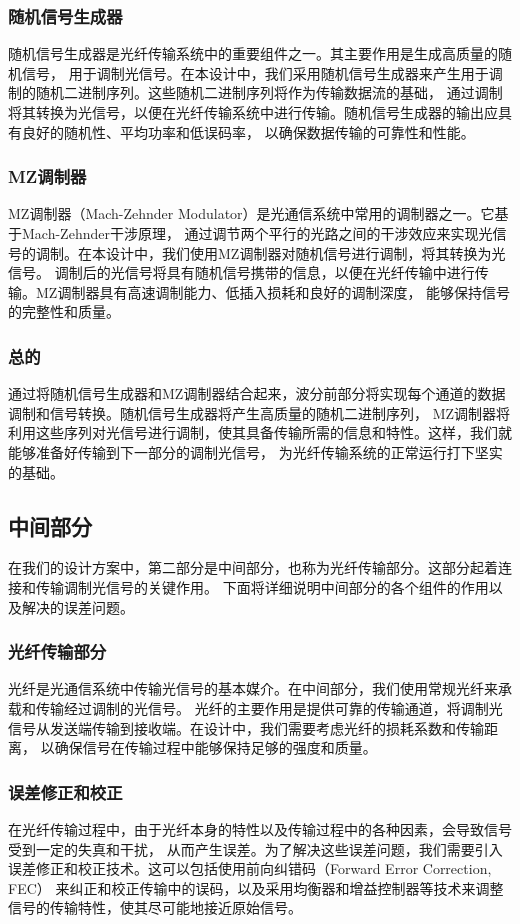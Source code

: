 \documentclass[12pt, a4paper, oneside]{article}
\begin{document}
\begin{spacing}{2.0}
\subsubsection*{随机信号生成器}
随机信号生成器是光纤传输系统中的重要组件之一。其主要作用是生成高质量的随机信号，
用于调制光信号。在本设计中，我们采用随机信号生成器来产生用于调制的随机二进制序列。这些随机二进制序列将作为传输数据流的基础，
通过调制将其转换为光信号，以便在光纤传输系统中进行传输。随机信号生成器的输出应具有良好的随机性、平均功率和低误码率，
以确保数据传输的可靠性和性能。
\subsubsection*{MZ调制器}
MZ调制器（Mach-Zehnder Modulator）是光通信系统中常用的调制器之一。它基于Mach-Zehnder干涉原理，
通过调节两个平行的光路之间的干涉效应来实现光信号的调制。在本设计中，我们使用MZ调制器对随机信号进行调制，将其转换为光信号。
调制后的光信号将具有随机信号携带的信息，以便在光纤传输中进行传输。MZ调制器具有高速调制能力、低插入损耗和良好的调制深度，
能够保持信号的完整性和质量。
\subsubsection*{总的}
通过将随机信号生成器和MZ调制器结合起来，波分前部分将实现每个通道的数据调制和信号转换。随机信号生成器将产生高质量的随机二进制序列，
MZ调制器将利用这些序列对光信号进行调制，使其具备传输所需的信息和特性。这样，我们就能够准备好传输到下一部分的调制光信号，
为光纤传输系统的正常运行打下坚实的基础。

\subsection{中间部分}
在我们的设计方案中，第二部分是中间部分，也称为光纤传输部分。这部分起着连接和传输调制光信号的关键作用。
下面将详细说明中间部分的各个组件的作用以及解决的误差问题。
\subsubsection*{光纤传输部分}
光纤是光通信系统中传输光信号的基本媒介。在中间部分，我们使用常规光纤来承载和传输经过调制的光信号。
光纤的主要作用是提供可靠的传输通道，将调制光信号从发送端传输到接收端。在设计中，我们需要考虑光纤的损耗系数和传输距离，
以确保信号在传输过程中能够保持足够的强度和质量。
\subsubsection*{误差修正和校正}
在光纤传输过程中，由于光纤本身的特性以及传输过程中的各种因素，会导致信号受到一定的失真和干扰，
从而产生误差。为了解决这些误差问题，我们需要引入误差修正和校正技术。这可以包括使用前向纠错码（Forward Error Correction, FEC）
来纠正和校正传输中的误码，以及采用均衡器和增益控制器等技术来调整信号的传输特性，使其尽可能地接近原始信号。

\end{spacing}
\end{document}
